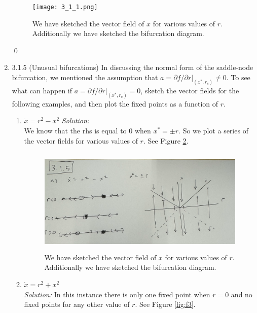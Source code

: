 \documentclass[10pt]{amsart}
\theoremstyle{nonumberplain}
\begin{document}
\begin{enumerate}[label={\bf {\arabic*}:}]
\begin{figure}[h]
	\centering
	\texttt{[image: 3\_1\_1.png]}
 	\caption{We have sketched the vector field of $x$ for various values of $r$. Additionally we have sketched the bifurcation diagram.}\label{fig:f1}
\end{figure}
\qed \\

\newpage

\item 3.1.5 (Unusual bifurcations) In discussing the normal form of the saddle-node bifurcation, we mentioned the assumption that $a = \left. \partial f / \partial r \right|_{(x^*, r_c)} \neq 0.$
To see what can happen if $a = \left. \partial f / \partial r \right|_{(x^*, r_c)} = 0$, sketch the vector fields for the following examples, and then plot the fixed points as a function of $r$. \\


\begin{enumerate}
\item $\dot x = r^2 - x^2$ 
\textit{Solution:} \\
We know that the rhs is equal to 0 when $x^* = \pm r$. So we plot a series of the vector fields for various values of $r$. See Figure \ref{fig:f2}.

\begin{figure}[h]
	\centering
	\includegraphics[height=2in]{3_1_5_a.png}
 	\caption{We have sketched the vector field of $x$ for various values of $r$. Additionally we have sketched the bifurcation diagram.}\label{fig:f2}
\end{figure}

\item $\dot x = r^2 + x^2$ \\
\textit{Solution:} In this instance there is only one fixed point when $r = 0$ and no fixed points for any other value of $r$. See Figure \ref{fig:f3}.


\end{enumerate}
\end{enumerate}
\end{document}
